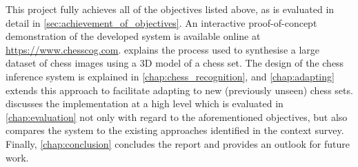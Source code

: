 This project fully achieves all of the objectives listed above, as is evaluated in detail in \cref{sec:achievement_of_objectives}.
An interactive proof-of-concept demonstration of the developed system is available online at \url{https://www.chesscog.com}.
 explains the process used to synthesise a large dataset of chess images using a 3D model of a chess set.
The design of the chess inference system is explained in \cref{chap:chess_recognition}, and \cref{chap:adapting} extends this approach to facilitate adapting to new (previously unseen) chess sets.
 discusses the implementation at a high level which is evaluated in \cref{chap:evaluation} not only with regard to the aforementioned objectives, but also compares the system to the existing approaches identified in the context survey.
Finally, \cref{chap:conclusion} concludes the report and provides an outlook for future work.